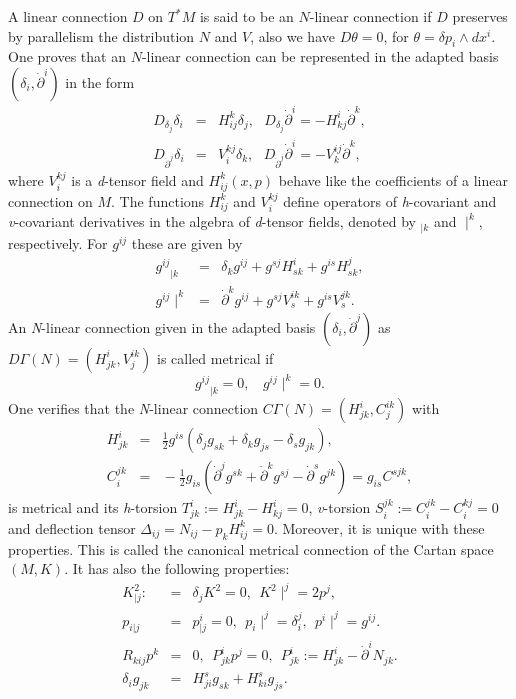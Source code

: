 \documentclass[10pt,a4paper]{article}
\theoremstyle{plain}
\theoremstyle{definition}
\begin{document}
A linear connection $D$ on $T^{\ast}M$ is said to be an
$N$-linear connection if $D$ preserves by parallelism the
distribution $N$ and $V$, also we have $D\theta=0$, for
$\theta=\delta p_i\wedge dx^i$. One proves that an $N$-linear
connection can be represented in the adapted basis
$(\delta_i,\dot{\partial}^i)$ in the form
\begin{eqnarray}
D_{\delta_j}\delta_i\!\!\!\!&=&\!\!\!\!H^k_{ij}\delta_j,\ \ \
D_{\delta_j}\dot{\partial}^i=-H^i_{kj}\dot{\partial}^k,\\
D_{\dot{\partial}^j}\delta_i\!\!\!\!&=&\!\!\!\!V^{kj}_i\delta_k,\ \
\ D_{\dot{\partial}^j}\dot{\partial}^i=-V^{ij}_k\dot{\partial}^k,
\end{eqnarray}
where $V^{kj}_i$ is a \textit{d}-tensor field and $H^k_{ij}(x,p)$
behave like the coefficients of a linear connection on $M$. The
functions $H^k_{ij}$ and $V^{kj}_i$ define operators of
\textit{h}-covariant and \textit{v}-covariant derivatives in the
algebra of \textit{d}-tensor fields, denoted by $_{|k}$ and
$\mid^k$, respectively. For $g^{ij}$ these are given by
\begin{eqnarray}
{g^{ij}}_{|k}\!\!\!\!&=&\!\!\!\!\delta_kg^{ij}+g^{sj}H^i_{sk}+g^{is}H^j_{sk},\\
g^{ij}\!\!\mid^k\!\!\!\!&=&\!\!\!\!\dot{\partial}^kg^{ij}+g^{sj}V^{ik}_s+g^{is}V^{jk}_s.
\end{eqnarray}
An \textit{N}-linear connection given in the adapted basis
$(\delta_i,\dot{\partial}^j)$ as $D\Gamma(N)=(H^i_{jk},V^{ik}_j)$ is
called metrical if
\begin{equation}
{g^{ij}}_{|k}=0,\ \ \ \ g^{ij}\!\!\mid^k=0.
\end{equation}
One verifies that the \textit{N}-linear connection
$C\Gamma(N)=(H^i_{jk},C^{ik}_j)$ with
\begin{eqnarray}
H^i_{jk}\!\!\!\!&=&\!\!\!\!\frac{1}{2}g^{is}(\delta_jg_{sk}+\delta_kg_{js}-\delta_sg_{jk}),\\
C^{jk}_i\!\!\!\!&=&\!\!\!\!-\frac{1}{2}g_{is}(\dot{\partial}^jg^{sk}+\dot{\partial}^kg^{sj}-\dot{\partial}^sg^{jk})=g_{is}C^{sjk},
\end{eqnarray}
is metrical and its \textit{h}-torsion
$T^i_{jk}:=H^i_{jk}-H^i_{kj}=0$, \textit{v}-torsion
$S^{jk}_i:=C^{jk}_i-C^{kj}_i=0$ and deflection tensor
$\Delta_{ij}=N_{ij}-p_kH^k_{ij}=0$. Moreover, it is unique with
these properties. This is called the canonical metrical connection
of the Cartan space $(M,K)$. It has also the following properties:
\begin{eqnarray}
K^2_{|j}:\!\!\!\!&=&\!\!\!\!\delta_jK^2=0,\ \ K^2\!\!\mid^j=2p^j,\\
p_{i|j}\!\!\!\!&=&\!\!\!\! p^i_{|j}=0,\ \  p_i\!\!\mid^j=\delta^j_i,\ \ p^i\!\!\mid^j=g^{ij}.\label{4}\\
R_{kij}p^k\!\!\!\!&=&\!\!\!\!0, \ \  P^i_{jk}p^j=0,\ \ P^i_{jk}:=H^i_{jk}-{\dot{\partial}}^iN_{jk}.\label{5}\\
\delta_ig_{jk}\!\!\!\!&=&\!\!\!\!H^s_{ji}g_{sk}+H^s_{ki}g_{js}.\label{6}
\end{eqnarray}
\end{document}
